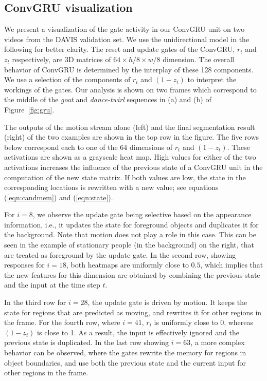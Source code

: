 \documentclass[10pt,twocolumn,letterpaper]{article}
\begin{document}
\subsection{ConvGRU visualization}
\label{sec:gru}
We present a visualization of the gate activity in our ConvGRU unit on two
videos from the DAVIS validation set. We use the unidirectional model in the
following for better clarity. The reset and update gates of the ConvGRU, $r_t$
and $z_t$ respectively, are 3D matrices of $64 \times h/8 \times w/8$
dimension.  The overall behavior of ConvGRU is determined by the interplay of
these 128 components. We use a selection of the components of $r_t$
and $(1 - z_t)$ to interpret the workings of the gates. Our analysis is shown on two frames which correspond
to the middle of the {\it goat} and {\it dance-twirl} sequences in (a) and (b)
of Figure~\ref{fig:gru}.

The outputs of the motion stream alone (left) and the final segmentation result
(right) of the two examples are shown in the top row in the figure. The five
rows below correspond each to one of the 64 dimensions of $r_t$ and $(1 -
z_t)$. These activations are shown as a grayscale heat map. High
values for either of the two activations increases the influence of the previous
state of a ConvGRU unit in the computation of the new state matrix. If
both values are low, the state in the corresponding locations is
rewritten with a new value; see equations (\ref{eqn:candmem}) and 
(\ref{eqn:state}).

For $i=8$, we observe the update gate being selective based on the appearance
information, i.e., it updates the state for foreground objects and duplicates
it for the background. Note that motion does not play a role in this case. This
can be seen in the example of stationary people (in the background) on the right, that are treated as foreground by the update gate. In the
second row, showing responses for $i=18$, both heatmaps are uniformly close to
$0.5$, which implies that the new features for this dimension are obtained by
combining the previous state and the input at the time step $t$.

In the third row for $i=28$, the update gate is driven by motion. It keeps the
state for regions that are predicted as moving, and rewrites it for other
regions in the frame. For the fourth row, where $i=41$, $r_t$ is uniformly
close to 0, whereas $(1 - z_t)$ is close to 1. As a result, the input is
effectively ignored and the previous state is duplicated. In the last row
showing $i=63$, a more complex behavior can be observed, where the gates
rewrite the memory for regions in object boundaries, and use both the previous
state and the current input for other regions in the frame.
\end{document}
